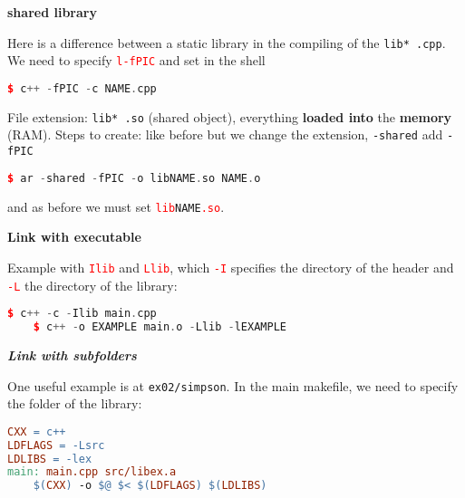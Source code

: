 \documentclass[fontsize=8pt, a4paper, landscape, fleqn]{scrartcl}
\renewcommand{\subsection}[1]{%
    \noindent\colorbox{subsectioncolor}{%
        \parbox{\dimexpr\columnwidth-2\fboxsep}{\color{white}\textbf{#1}}}%
    \vspace{0.5mm}%
}
\renewcommand{\subsubsection}[1]{%
    \noindent\textbf{\textit{\color{subsectioncolor}#1}}%
    \vspace{1mm}%
}
\begin{document}
\begin{multicols*}{3}[\raggedcolumns]
    \subsection{shared library}
    Here is a difference between a static library in the compiling of the \lstinline{lib* .cpp}. We need to specify \textcolor{red}{\lstinline{l-fPIC}} and set in the shell

    \begin{lstlisting}[language=C++, breaklines]
    $ c++ -fPIC -c NAME.cpp \end{lstlisting}
    
    File extension: \lstinline{lib* .so} (shared object), everything \textbf{loaded into} the \textbf{memory} (RAM).
    Steps to create:  like before but we change the extension, \lstinline{-shared} add \lstinline{-fPIC}
    
    \begin{lstlisting}[language=C++, breaklines]
    $ ar -shared -fPIC -o libNAME.so NAME.o \end{lstlisting}

    and as before we must set \textcolor{red}{\lstinline{lib}}\lstinline{NAME}\textcolor{red}{\lstinline{.so}}.

    \subsection{Link with executable}
    Example with \textcolor{red}{\lstinline{Ilib}} and \textcolor{red}{\lstinline{Llib}}, which \textcolor{red}{\lstinline{-I}} specifies the directory of the header and \textcolor{red}{\lstinline{-L}} the directory of the library:
    \begin{lstlisting}[language=C++, breaklines, emph={-Ilib, -Llib}, emphstyle={\color{red}}]
    $ c++ -c -Ilib main.cpp 
    $ c++ -o EXAMPLE main.o -Llib -lEXAMPLE \end{lstlisting}
    
   \subsubsection{Link with subfolders}
One useful example is at \lstinline{ex02/simpson}. In the main makefile, we need to specify the folder of the library:
\begin{lstlisting}[language=make, breaklines, emph={src}, emphstyle={\color{red}}]
CXX = c++
LDFLAGS = -Lsrc
LDLIBS = -lex
main: main.cpp src/libex.a
    $(CXX) -o $@ $< $(LDFLAGS) $(LDLIBS)
\end{lstlisting}

\end{multicols*}
\end{document}

